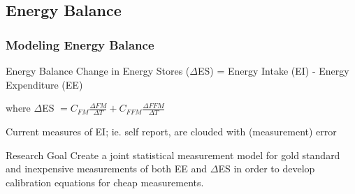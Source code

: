 \documentclass[handout]{beamer}\usepackage[]{graphicx}\usepackage[]{color}
\begin{document}
\subsection{Energy Balance}
\begin{frame}
\frametitle{Modeling Energy Balance}

\begin{block}{Energy Balance}
Change in Energy Stores ($\Delta$ES) = Energy Intake (EI) - Energy Expenditure (EE)
\end{block}

where $\Delta$ES $= C_{FM} \frac{\Delta FM}{\Delta T } + C_{FFM} \frac{\Delta FFM}{\Delta T}$  



\vspace{0.3cm}


Current measures of EI; ie. self report, are clouded with (measurement) error \\

\vspace{0.3cm}

\begin{block}{Research Goal}
Create a joint statistical measurement model for gold standard and inexpensive measurements of both EE and $\Delta$ES in order to develop calibration equations for cheap measurements.\\
\end{block}



\end{frame}

% 
% 
% 
% 
% 
\end{document}
